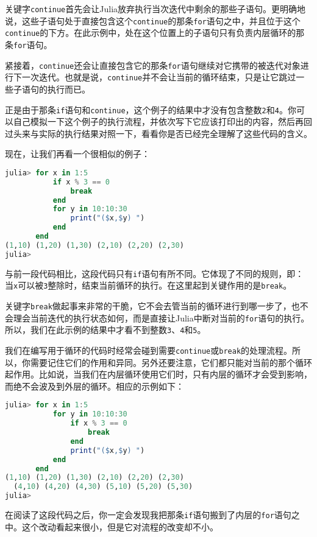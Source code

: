 关键字\verb|continue|首先会让Julia放弃执行当次迭代中剩余的那些子语句。更明确地说，这些子语句处于直接包含这个\verb|continue|的那条\verb|for|语句之中，并且位于这个\verb|continue|的下方。在此示例中，处在这个位置上的子语句只有负责内层循环的那条\verb|for|语句。

紧接着，\verb|continue|还会让直接包含它的那条\verb|for|语句继续对它携带的被迭代对象进行下一次迭代。也就是说，\verb|continue|并不会让当前的循环结束，只是让它跳过一些子语句的执行而已。

正是由于那条\verb|if|语句和\verb|continue|，这个例子的结果中才没有包含整数\verb|2|和\verb|4|。你可以自己模拟一下这个例子的执行流程，并依次写下它应该打印出的内容，然后再回过头来与实际的执行结果对照一下，看看你是否已经完全理解了这些代码的含义。

现在，让我们再看一个很相似的例子：
\begin{lstlisting}[language=julia]
julia> for x in 1:5
           if x % 3 == 0
               break
           end
           for y in 10:10:30
               print("($x,$y) ")
           end
       end
(1,10) (1,20) (1,30) (2,10) (2,20) (2,30) 
julia> 
\end{lstlisting}

与前一段代码相比，这段代码只有\verb|if|语句有所不同。它体现了不同的规则，即：当\verb|x|可以被\verb|3|整除时，结束当前循环的执行。在这里起到关键作用的是\verb|break|。

关键字\verb|break|做起事来非常的干脆，它不会去管当前的循环进行到哪一步了，也不会理会当前迭代的执行状态如何，而是直接让Julia中断对当前的\verb|for|语句的执行。所以，我们在此示例的结果中才看不到整数\verb|3|、\verb|4|和\verb|5|。

我们在编写用于循环的代码时经常会碰到需要\verb|continue|或\verb|break|的处理流程。所以，你需要记住它们的作用和异同。另外还要注意，它们都只能对当前的那个循环起作用。比如说，当我们在内层循环使用它们时，只有内层的循环才会受到影响，而绝不会波及到外层的循环。相应的示例如下：
\begin{lstlisting}[language=julia]
julia> for x in 1:5
           for y in 10:10:30
               if x % 3 == 0 
                   break
               end
               print("($x,$y) ")
           end
       end
(1,10) (1,20) (1,30) (2,10) (2,20) (2,30)
  (4,10) (4,20) (4,30) (5,10) (5,20) (5,30) 
julia> 
\end{lstlisting}

在阅读了这段代码之后，你一定会发现我把那条\verb|if|语句搬到了内层的\verb|for|语句之中。这个改动看起来很小，但是它对流程的改变却不小。

